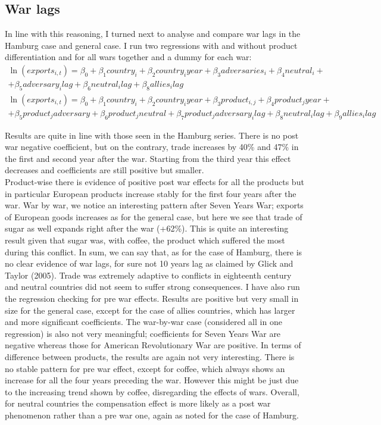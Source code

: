 \documentclass[12pt,a4paper,titlepage,english]{article}
\begin{document}
\subsection{War lags}
In line with this reasoning, I turned next to analyse and compare war lags in the Hamburg case and general case. I run two regressions with and without product differentiation and for all wars together and a dummy for each war: 
\begin{multline}
\ln(exports_{i,t})=\beta_0+\beta_1country_i+\beta_2country_iyear+\beta_3adversaries_i+\beta_4neutral_i+\\+\beta_5adversary_ilag+\beta_6neutral_ilag+\beta_8allies_ilag
\end{multline}
\begin{multline}
\ln(exports_{i,t})=\beta_0+\beta_1country_i+\beta_2country_iyear+\beta_3product_{i,j}+\beta_4product_jyear+\\+\beta_5product_jadversary+ \beta_6product_jneutral+\beta_7product_jadversary_ilag+\beta_8neutral_ilag+\beta_9allies_ilag
\end{multline}

Results are quite in line with those seen in the Hamburg series. There is no post war negative coefficient, but on the contrary, trade increases by 40\% and 47\% in the first and second year after the war. Starting from the third year this effect decreases and coefficients are still positive but smaller. \\
Product-wise there is evidence of positive post war effects for all the products but in particular European products increase stably for the first four years after the war. War by war, we notice an interesting pattern after Seven Years War; exports of European goods increases as for the general case, but here we see that trade of sugar as well expands right after the war (+62\%). This is quite an interesting result given that sugar was, with coffee, the product which suffered the most during this conflict. 
In sum, we can say that, as for the case of Hamburg, there is no clear evidence of war lags, for sure not 10 years lag as claimed by Glick and Taylor (2005). Trade was extremely adaptive to conflicts in eighteenth century and neutral countries did not seem to suffer strong consequences.
I have also run the regression checking for pre war effects. Results are positive but very small in size for the general case, except for the case of allies countries, which has larger and more significant coefficients. The war-by-war case (considered all in one regression) is also not very meaningful; coefficients for Seven Years War are negative whereas those for American Revolutionary War are positive. In terms of difference between products, the results are again not very interesting. There is no stable pattern for pre war effect, except for coffee, which always shows an increase for all the four years preceding the war. However this might be just due to the increasing trend shown by coffee, disregarding the effects of wars.
Overall, for neutral countries the compensation effect is more likely as a post war phenomenon rather than a pre war one, again as noted for the case of Hamburg. 
\fi
\end{document}
